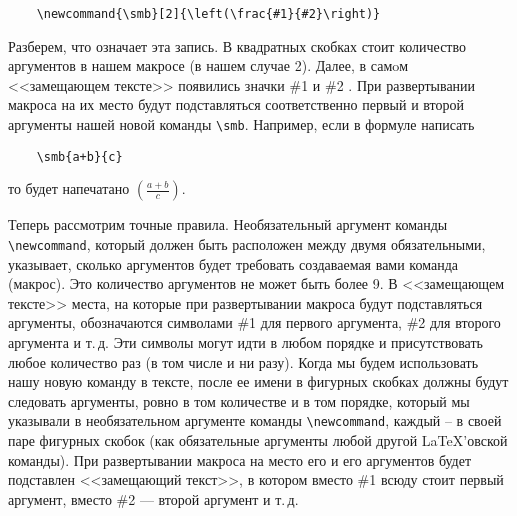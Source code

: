 \begin{verbatim}
	\newcommand{\smb}[2]{\left(\frac{#1}{#2}\right)}
\end{verbatim}

Разберем, что означает эта запись. В квадратных скобках стоит количество аргументов в нашем макросе (в нашем случае 2). Далее, в самoм <<замещающем тексте>> появились значки \#1 и \#2 . При развертывании макроса на их место будут подставляться соответственно первый и второй аргументы нашей новой команды \verb"\smb". Например, если в формуле написать

\begin{verbatim}
	\smb{a+b}{c}
\end{verbatim}
то будет напечатано $\left(\frac{a+b}{c}\right)$.

Теперь рассмотрим точные правила. Необязательный аргумент команды \verb"\newcommand", который должен быть расположен между двумя обязательными, указывает, сколько аргументов будет требовать создаваемая вами команда (макрос). Это количество аргументов не может быть более 9. В <<замещающем тексте>> места, на которые при развертывании макроса будут подставляться аргументы, обозначаются символами \#1 для первого аргумента, \#2 для второго аргумента и т.\,д. Эти символы могут идти в любом порядке и присутствовать любое количество раз (в том числе и ни разу). Когда мы будем использовать нашу новую команду в тексте, после ее имени в фигурных скобках должны будут следовать аргументы, ровно в том количестве и в том порядке, который мы указывали в необязательном аргументе команды \verb"\newcommand", каждый -- в своей паре фигурных скобок (как обязательные аргументы любой другой \LaTeX’овской команды). При развертывании макроса на место его и его аргументов будет подставлен <<замещающий текст>>, в котором вместо \#1 всюду стоит первый аргумент, вместо \#2 — второй аргумент и т.\,д.